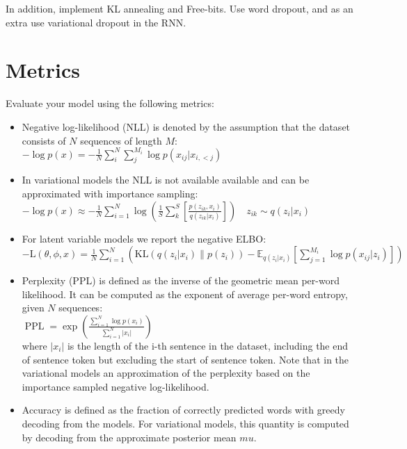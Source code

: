 In addition, implement KL annealing and Free-bits. Use word dropout, and  as an extra use variational dropout in the RNN. 




\section{Metrics}

Evaluate your model using the following metrics:
\begin{itemize}
\item Negative log-likelihood (NLL) is denoted by the assumption that the dataset consists of $N$ sequences of length $M$:\\
$-\log p(x)=-\frac{1}{N} \sum_{i}^{N} \sum_{j}^{M_{i}} \log p\left(x_{i j} | x_{i,<j}\right)$
\item In variational models the NLL is not available available and can be approximated with
importance sampling:\\
$- \log p(x) \approx-\frac{1}{N} \sum_{i=1}^{N} \log \left(\frac{1}{S} \sum_{k}^{S}\left[\frac{p\left(z_{i k}, x_{i}\right)}{q\left(z_{i k} | x_{i}\right)}\right]\right) \quad z_{i k} \sim q\left(z_{i} | x_{i}\right)$
\item For latent variable models we report the negative ELBO:\\
$-\mathrm{L}(\theta, \phi, x)=\frac{1}{N} \sum_{i=1}^{N}\left(\mathrm{KL}(q\left(z_{i} | x_{i}\right) \| p\left(z_{i}\right))-\mathbb{E}_{q\left(z_{i} | x_{i}\right)}\left[\sum_{j=1}^{M_{i}} \log p\left(x_{i j} | z_{i}\right)\right]\right)$
\item Perplexity (PPL) is defined as the inverse of the geometric mean per-word likelihood. It can be computed as the exponent of average per-word entropy, given $N$ sequences: \\
$\operatorname{PPL}=\exp \left(\frac{\sum_{i=1}^{N} \log p\left(x_{i}\right)}{\sum_{i=1}^{N}\left|x_{i}\right|}\right)$ \\
where $|x_i|$ is the length of the i-th sentence in the dataset, including the end of sentence token but excluding the start of sentence token. Note that in the variational models an approximation of the perplexity based on the importance sampled negative log-likelihood.
\item Accuracy is defined as the fraction of correctly predicted words with greedy decoding from the models. For variational models, this quantity is computed by decoding from the approximate posterior mean $mu$.
\end{itemize}

